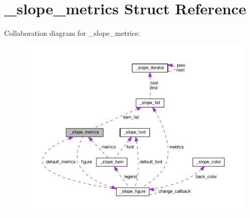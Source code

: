 \hypertarget{struct__slope__metrics}{\section{\+\_\+slope\+\_\+metrics Struct Reference}
\label{struct__slope__metrics}
}


Collaboration diagram for \+\_\+slope\+\_\+metrics\+:
\nopagebreak
\begin{figure}[H]
\begin{center}
\leavevmode
\includegraphics[width=350pt]{struct__slope__metrics__coll__graph}
\end{center}
\end{figure}
